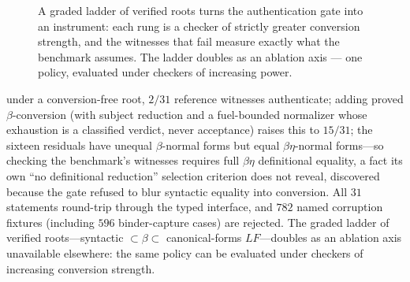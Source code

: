 \documentclass[11pt]{article}
\begin{document}
\begin{figure}[htbp]
\centering
{}
\caption{A graded ladder of verified roots turns the authentication gate into an
instrument: each rung is a checker of strictly greater conversion strength, and the
witnesses that fail measure exactly what the benchmark assumes. The ladder doubles as an
ablation axis --- one policy, evaluated under checkers of increasing power.}
\label{fig:roots}
\end{figure} under a conversion-free root, $2/31$ reference witnesses
authenticate; adding proved $\beta$-conversion (with subject reduction and a
fuel-bounded normalizer whose exhaustion is a classified verdict, never acceptance)
raises this to $15/31$; the sixteen residuals have unequal $\beta$-normal forms but
equal $\beta\eta$-normal forms---so checking the benchmark's witnesses requires full
$\beta\eta$ definitional equality, a fact its own ``no definitional reduction''
selection criterion does not reveal, discovered because the gate refused to blur
syntactic equality into conversion. All $31$ statements round-trip through the typed
interface, and $782$ named corruption fixtures (including $596$ binder-capture cases)
are rejected. The graded ladder of verified roots---syntactic $\subset\beta\subset$
canonical-forms $LF$---doubles as an ablation axis unavailable elsewhere: the same
policy can be evaluated under checkers of increasing conversion strength.
\end{document}
